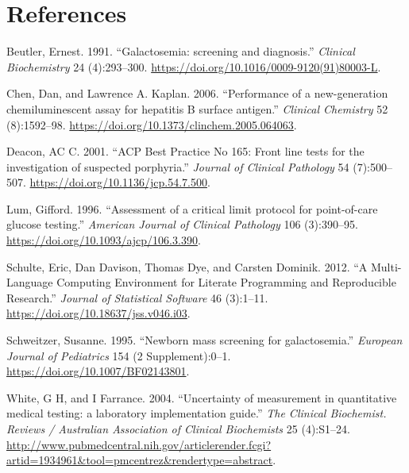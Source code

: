 \documentclass[review]{elsarticle}
\begin{document}
\section*{References}
\label{sec:org3657df2}
\begin{hangparas}{1.5em}{1}
\hypertarget{citeproc_bib_item_1}{Beutler, Ernest. 1991. “Galactosemia: screening and diagnosis.” \textit{Clinical Biochemistry} 24 (4):293–300. \href{https://doi.org/10.1016/0009-9120(91)80003-L}{https://doi.org/10.1016/0009-9120(91)80003-L}.}

\hypertarget{citeproc_bib_item_2}{Chen, Dan, and Lawrence A. Kaplan. 2006. “Performance of a new-generation chemiluminescent assay for hepatitis B surface antigen.” \textit{Clinical Chemistry} 52 (8):1592–98. \href{https://doi.org/10.1373/clinchem.2005.064063}{https://doi.org/10.1373/clinchem.2005.064063}.}

\hypertarget{citeproc_bib_item_3}{Deacon, AC C. 2001. “ACP Best Practice No 165: Front line tests for the investigation of suspected porphyria.” \textit{Journal of Clinical Pathology} 54 (7):500–507. \href{https://doi.org/10.1136/jcp.54.7.500}{https://doi.org/10.1136/jcp.54.7.500}.}

\hypertarget{citeproc_bib_item_4}{Lum, Gifford. 1996. “Assessment of a critical limit protocol for point-of-care glucose testing.” \textit{American Journal of Clinical Pathology} 106 (3):390–95. \href{https://doi.org/10.1093/ajcp/106.3.390}{https://doi.org/10.1093/ajcp/106.3.390}.}

\hypertarget{citeproc_bib_item_5}{Schulte, Eric, Dan Davison, Thomas Dye, and Carsten Dominik. 2012. “A Multi-Language Computing Environment for Literate Programming and Reproducible Research.” \textit{Journal of Statistical Software} 46 (3):1–11. \href{https://doi.org/10.18637/jss.v046.i03}{https://doi.org/10.18637/jss.v046.i03}.}

\hypertarget{citeproc_bib_item_6}{Schweitzer, Susanne. 1995. “Newborn mass screening for galactosemia.” \textit{European Journal of Pediatrics} 154 (2 Supplement):0–1. \href{https://doi.org/10.1007/BF02143801}{https://doi.org/10.1007/BF02143801}.}

\hypertarget{citeproc_bib_item_7}{White, G H, and I Farrance. 2004. “Uncertainty of measurement in quantitative medical testing: a laboratory implementation guide.” \textit{The Clinical Biochemist. Reviews / Australian Association of Clinical Biochemists} 25 (4):S1–24. \href{http://www.pubmedcentral.nih.gov/articlerender.fcgi?artid=1934961&tool=pmcentrez&rendertype=abstract}{http://www.pubmedcentral.nih.gov/articlerender.fcgi?artid=1934961\&tool=pmcentrez\&rendertype=abstract}.}
\end{hangparas}
\end{document}
